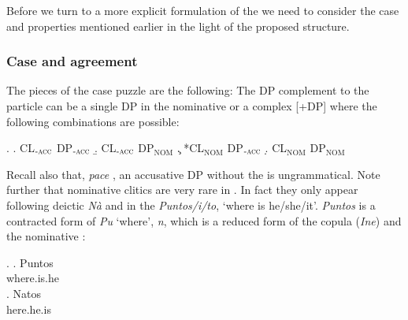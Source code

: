\documentclass[output=paper]{LSP/langsci}
\begin{document}
Before we turn to a more explicit formulation of the  we need to consider the case and  properties  mentioned earlier in the light of the proposed structure.

\subsubsection{Case and agreement}
 The pieces of the case puzzle are the following:  The DP complement to the particle can be a single DP in the nominative or a complex [+DP] where the following combinations are possible:


\Lsciex.
\a. CL$_{\text{-\textsc{acc}}}$ DP$_{\text{-\textsc{acc}}}$
\b. CL$_{\text{-\textsc{acc}}}$ DP$_{\text{NOM}}$
\c. *CL$_{\text{NOM}}$ DP$_{\text{-\textsc{acc}}}$
\d. CL$_{\text{NOM}}$ DP$_{\text{NOM}}$


Recall also that, \textit{pace} \citet{joseph:81}, an accusative DP without the  is ungrammatical.
Note further that nominative clitics are very rare in .  In fact they only appear following deictic \textit{N\`{a}} and in the  \textit{Puntos/i/to}, `where is he/she/it'.  \textit{Puntos} is a contracted form of \textit{Pu} `where', \textit{n}, which is a reduced form of the copula (\textit{Ine}) and the nominative :

\Lsciex.
\ag. Puntos\\
 where.is.he\\
\bg. Natos\\
here.he.is\\
\end{document}
